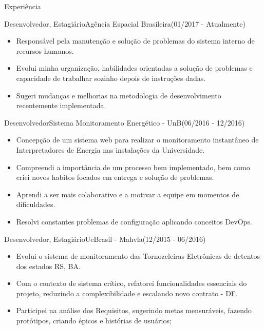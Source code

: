 \documentclass[]{fraguilarcv}
\begin{document}
	\makeheader

	\begin{cvsection}{Experiência}
		\begin{cvsubsection}{Desenvolvedor, Estagiário}{Agência Espacial Brasileira}{(01/2017 - Atualmente)}
			\begin{itemize}
              \item Responsável pela manutenção e solução de problemas do sistema interno de recursos humanos.
              \item Evolui minha organização, habilidades orientadas a solução de problemas e capacidade de trabalhar sozinho depois de instruções dadas.
              \item Sugeri mudanças e melhorias na metodologia de desenvolvimento recentemente implementada.
			\end{itemize}
		\end{cvsubsection}

		\begin{cvsubsection}{Desenvolvedor}{Sistema Monitoramento Energético - UnB}{(06/2016 - 12/2016)}
			\begin{itemize}
              \item Concepção de um sistema web para realizar o monitoramento instantâneo de Interpretadores de Energia nas instalações da Universidade.
              \item Compreendi a importância de um processo bem implementado, bem como criei novos habitos focados em entrega e solução de problemas.
              \item Aprendi a ser mais colaborativo e a motivar a equipe em momentos de dificuldades.
              \item Resolvi constantes problemas de configuração aplicando conceitos DevOps.
			\end{itemize}
		\end{cvsubsection}

		\begin{cvsubsection}{Desenvolvedor, Estagiário}{UeBrasil - Mahvla}{(12/2015 - 06/2016)}
			\begin{itemize}
				\item Evolui o sistema de monitoramento das Tornozeleiras Eletrônicas de detentos dos estados RS, BA.
	      		\item Com o contexto de sistema crítico, refatorei funcionalidades essenciais do projeto, reduzindo a complexibilidade e escalando novo contrato - DF.
	      		\item Participei na análise dos Requisitos, sugerindo metas mensuráveis, fazendo protótipos, criando épicos e histórias de usuários;
			\end{itemize}
		\end{cvsubsection}


\end{cvsection}
\end{document}
